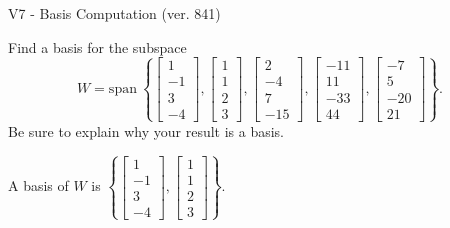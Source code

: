 \begin{exercise}
  \begin{exerciseTitle}V7 - Basis Computation (ver. 841)\end{exerciseTitle}
  \begin{exerciseStatement}
    Find a basis for the subspace 
\[W=\mathrm{span}\ \left\{\left[\begin{array}{r}
1 \\
-1 \\
3 \\
-4
\end{array}\right] , \left[\begin{array}{r}
1 \\
1 \\
2 \\
3
\end{array}\right] , \left[\begin{array}{r}
2 \\
-4 \\
7 \\
-15
\end{array}\right] , \left[\begin{array}{r}
-11 \\
11 \\
-33 \\
44
\end{array}\right] , \left[\begin{array}{r}
-7 \\
5 \\
-20 \\
21
\end{array}\right]\right\}.\]
 Be sure to explain why your result is a basis.


  \end{exerciseStatement}
  \begin{exerciseAnswer}
   A basis of \(W\) is  \(\left\{\left[\begin{array}{r}
1 \\
-1 \\
3 \\
-4
\end{array}\right] , \left[\begin{array}{r}
1 \\
1 \\
2 \\
3
\end{array}\right]\right\}\).
  


  \end{exerciseAnswer}
\end{exercise}